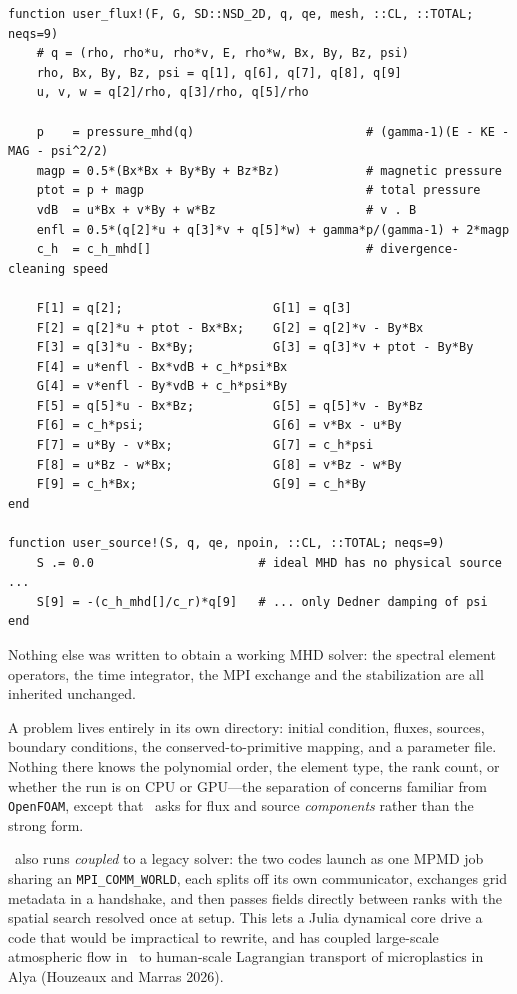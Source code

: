 \documentclass[10pt,onecolumn]{article}
\begin{document}
\begin{lstlisting}[caption={2D ideal GLM-MHD: the complete flux and source.}]
function user_flux!(F, G, SD::NSD_2D, q, qe, mesh, ::CL, ::TOTAL; neqs=9)
    # q = (rho, rho*u, rho*v, E, rho*w, Bx, By, Bz, psi)
    rho, Bx, By, Bz, psi = q[1], q[6], q[7], q[8], q[9]
    u, v, w = q[2]/rho, q[3]/rho, q[5]/rho

    p    = pressure_mhd(q)                        # (gamma-1)(E - KE - MAG - psi^2/2)
    magp = 0.5*(Bx*Bx + By*By + Bz*Bz)            # magnetic pressure
    ptot = p + magp                               # total pressure
    vdB  = u*Bx + v*By + w*Bz                     # v . B
    enfl = 0.5*(q[2]*u + q[3]*v + q[5]*w) + gamma*p/(gamma-1) + 2*magp
    c_h  = c_h_mhd[]                              # divergence-cleaning speed

    F[1] = q[2];                     G[1] = q[3]
    F[2] = q[2]*u + ptot - Bx*Bx;    G[2] = q[2]*v - By*Bx
    F[3] = q[3]*u - Bx*By;           G[3] = q[3]*v + ptot - By*By
    F[4] = u*enfl - Bx*vdB + c_h*psi*Bx
    G[4] = v*enfl - By*vdB + c_h*psi*By
    F[5] = q[5]*u - Bx*Bz;           G[5] = q[5]*v - By*Bz
    F[6] = c_h*psi;                  G[6] = v*Bx - u*By
    F[7] = u*By - v*Bx;              G[7] = c_h*psi
    F[8] = u*Bz - w*Bx;              G[8] = v*Bz - w*By
    F[9] = c_h*Bx;                   G[9] = c_h*By
end

function user_source!(S, q, qe, npoin, ::CL, ::TOTAL; neqs=9)
    S .= 0.0                       # ideal MHD has no physical source ...
    S[9] = -(c_h_mhd[]/c_r)*q[9]   # ... only Dedner damping of psi
end
\end{lstlisting}

\noindent
Nothing else was written to obtain a working MHD solver: the spectral element
operators, the time integrator, the MPI exchange and the stabilization are all
inherited unchanged.

A problem lives entirely in its own directory: initial condition, fluxes,
sources, boundary conditions, the conserved-to-primitive mapping, and a
parameter file. Nothing there knows the polynomial order, the element type, the
rank count, or whether the run is on CPU or GPU---the separation of concerns
familiar from \texttt{OpenFOAM}, except that \je~asks for flux and source
\emph{components} rather than the strong form.

\je~also runs \emph{coupled} to a legacy solver: the two codes launch as one
MPMD job sharing an \texttt{MPI\_COMM\_WORLD}, each splits off its own
communicator, exchanges grid metadata in a handshake, and then passes fields
directly between ranks with the spatial search resolved once at setup. This lets
a Julia dynamical core drive a code that would be impractical to rewrite, and
has coupled large-scale atmospheric flow in \je~to human-scale Lagrangian
transport of microplastics in Alya (Houzeaux and Marras 2026).
\end{document}
